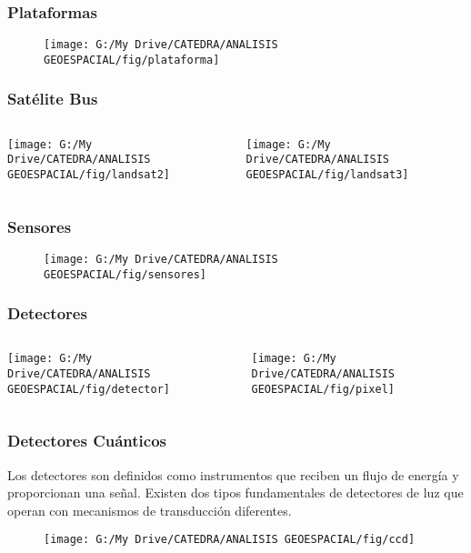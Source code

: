 \documentclass[14pt]{beamer}
\begin{document}
\begin{frame}
\frametitle{Plataformas} 
 \begin{figure}
    \centering
    \texttt{[image: G:/My Drive/CATEDRA/ANALISIS GEOESPACIAL/fig/plataforma]}
  \end{figure}
\end{frame}
\begin{frame}
\frametitle{Satélite Bus}
  \begin{columns}
		\begin{column}{.5\linewidth}
		 \texttt{[image: G:/My Drive/CATEDRA/ANALISIS GEOESPACIAL/fig/landsat2]}
		\end{column}
		\begin{column}{.5\linewidth}
\texttt{[image: G:/My Drive/CATEDRA/ANALISIS GEOESPACIAL/fig/landsat3]}
		\end{column}
	\end{columns}
\end{frame}
\begin{frame}
\frametitle{Sensores} 
 \begin{figure}
    \centering
    \texttt{[image: G:/My Drive/CATEDRA/ANALISIS GEOESPACIAL/fig/sensores]}
  \end{figure}
\end{frame}
\begin{frame}
\frametitle{Detectores}
  \begin{columns}
		\begin{column}{.3\linewidth}
		 \texttt{[image: G:/My Drive/CATEDRA/ANALISIS GEOESPACIAL/fig/detector]}
		\end{column}
		\begin{column}{.7\linewidth}
\texttt{[image: G:/My Drive/CATEDRA/ANALISIS GEOESPACIAL/fig/pixel]}
		\end{column}
	\end{columns}
\end{frame}
\begin{frame}
\frametitle{Detectores Cuánticos}
\scriptsize{
Los detectores son definidos como instrumentos que reciben un flujo de energía y proporcionan una señal. Existen dos tipos fundamentales de detectores de luz que operan con mecanismos de transducción diferentes.
}
 \begin{figure}
    \centering
    \texttt{[image: G:/My Drive/CATEDRA/ANALISIS GEOESPACIAL/fig/ccd]}
  \end{figure}
\end{frame}
\end{document}
